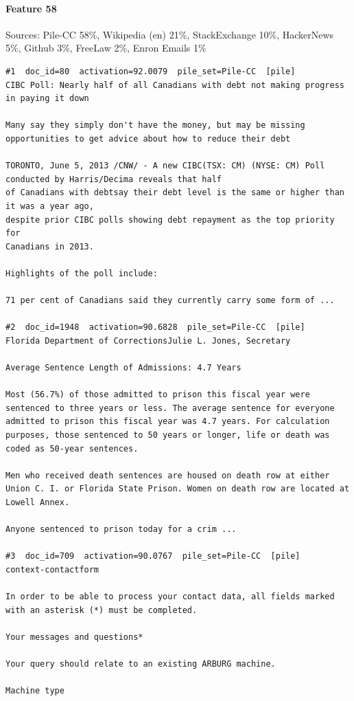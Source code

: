 \paragraph*{Feature 58} Sources: Pile-CC 58\%, Wikipedia (en) 21\%, StackExchange 10\%, HackerNews 5\%, Github 3\%, FreeLaw 2\%, Enron Emails 1\%

\begin{verbatim}
#1  doc_id=80  activation=92.0079  pile_set=Pile-CC  [pile]
CIBC Poll: Nearly half of all Canadians with debt not making progress in paying it down

Many say they simply don't have the money, but may be missing
opportunities to get advice about how to reduce their debt

TORONTO, June 5, 2013 /CNW/ - A new CIBC(TSX: CM) (NYSE: CM) Poll conducted by Harris/Decima reveals that half
of Canadians with debtsay their debt level is the same or higher than it was a year ago,
despite prior CIBC polls showing debt repayment as the top priority for
Canadians in 2013.

Highlights of the poll include:

71 per cent of Canadians said they currently carry some form of ...

#2  doc_id=1948  activation=90.6828  pile_set=Pile-CC  [pile]
Florida Department of CorrectionsJulie L. Jones, Secretary

Average Sentence Length of Admissions: 4.7 Years

Most (56.7%) of those admitted to prison this fiscal year were sentenced to three years or less. The average sentence for everyone admitted to prison this fiscal year was 4.7 years. For calculation purposes, those sentenced to 50 years or longer, life or death was coded as 50-year sentences.

Men who received death sentences are housed on death row at either Union C. I. or Florida State Prison. Women on death row are located at Lowell Annex.

Anyone sentenced to prison today for a crim ...

#3  doc_id=709  activation=90.0767  pile_set=Pile-CC  [pile]
context-contactform

In order to be able to process your contact data, all fields marked with an asterisk (*) must be completed.

Your messages and questions*

Your query should relate to an existing ARBURG machine.

Machine type


\end{verbatim}
